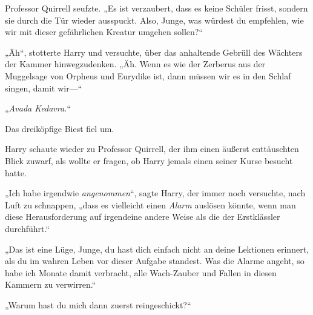 Professor Quirrell seufzte.
„Es ist verzaubert, dass es keine Schüler frisst, sondern sie durch die Tür wieder ausspuckt. Also, Junge, was würdest du empfehlen, wie wir mit dieser gefährlichen Kreatur umgehen sollen?“

„Äh“, stotterte Harry und versuchte, über das anhaltende Gebrüll des Wächters der Kammer hinwegzudenken. „Äh. Wenn es wie der Zerberus aus der Muggelsage von Orpheus und Eurydike ist, dann müssen wir es in den Schlaf singen, damit wir—“

„\emph{Avada Kedavra.}“

Das dreiköpfige Biest fiel um.

Harry schaute wieder zu Professor Quirrell, der ihm einen äußerst enttäuschten Blick zuwarf, als wollte er fragen, ob Harry jemals einen seiner Kurse besucht hatte.

„Ich habe irgendwie \emph{angenommen}“, sagte Harry, der immer noch versuchte, nach Luft zu schnappen, „dass es vielleicht einen \emph{Alarm} auslösen könnte, wenn man diese Herausforderung auf irgendeine andere Weise als die der Erstklässler durchführt.“

„Das ist eine Lüge, Junge, du hast dich einfach nicht an deine Lektionen erinnert, als du im wahren Leben vor dieser Aufgabe standest. Was die Alarme angeht, so habe ich Monate damit verbracht, alle Wach-Zauber und Fallen in diesen Kammern zu verwirren.“

„Warum hast du mich dann zuerst reingeschickt?“

